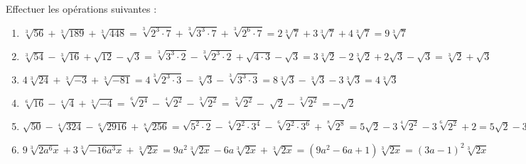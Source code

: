 \begin{solution}
Effectuer les opérations suivantes :
\begin{enumerate}
\item $\sqrt[3]{56}+\sqrt[3]{189}+\sqrt[3]{448}=\sqrt[3]{{{2}^{3}}\cdot 7}+\sqrt[3]{{{3}^{3}}\cdot 7}+\sqrt[3]{{{2}^{6}}\cdot 7}=2\sqrt[3]{7}+3\sqrt[3]{7}+4\sqrt[3]{7}=9\sqrt[3]{7}$
\item $\sqrt[3]{54}-\sqrt[3]{16}+\sqrt{12}-\sqrt{3}=\sqrt[3]{{{3}^{3}}\cdot 2}-\sqrt[3]{{{2}^{3}}\cdot 2}+\sqrt{4\cdot 3}-\sqrt{3}=3\sqrt[3]{2}-2\sqrt[3]{2}+2\sqrt{3}-\sqrt{3}=\sqrt[3]{2}+\sqrt{3}$
\item $4\sqrt[3]{24}+\sqrt[3]{-3}+\sqrt[3]{-81}=4\sqrt[3]{{{2}^{3}}\cdot 3}-\sqrt[3]{3}-\sqrt[3]{{{3}^{3}}\cdot 3}=8\sqrt[3]{3}-\sqrt[3]{3}-3\sqrt[3]{3}=4\sqrt[3]{3}$
\item $\sqrt[6]{16}-\sqrt[4]{4}+\sqrt[3]{-4}=\sqrt[6]{{{2}^{4}}}-\sqrt[4]{{{2}^{2}}}-\sqrt[3]{{{2}^{2}}}=\sqrt[3]{{{2}^{2}}}-\sqrt[{}]{2}-\sqrt[3]{{{2}^{2}}}=-\sqrt{2}$
\item $\sqrt{50}-\sqrt[4]{324}-\sqrt[6]{2916}+\sqrt[8]{256}=\sqrt{{{5}^{2}}\cdot 2}-\sqrt[4]{{{2}^{2}}\cdot {{3}^{4}}}-\sqrt[6]{{{2}^{2}}\cdot {{3}^{6}}}+\sqrt[8]{{{2}^{8}}}
=5\sqrt{2}-3\sqrt[4]{{{2}^{2}}}-3\sqrt[6]{{{2}^{2}}}+2=5\sqrt{2}-3\sqrt{2}-3\sqrt[3]{2}+2=2\sqrt{2}-3\sqrt[3]{2}+2$
\item $9\sqrt[3]{2{{a}^{6}}x}+3\sqrt[3]{-16{{a}^{3}}x}+\sqrt[3]{2x}=9{{a}^{2}}\sqrt[3]{2x}-6a\sqrt[3]{2x}+\sqrt[3]{2x}=\left( 9{{a}^{2}}-6a+1 \right)\sqrt[3]{2x}={{\left( 3a-1 \right)}^{2}}\sqrt[3]{2x}$
\end{enumerate}
\end{solution}

